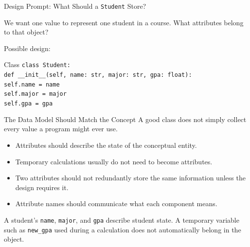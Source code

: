 \documentclass[aspectratio=169,10pt]{beamer}
\begin{document}
\begin{frame}{Design Prompt: What Should a \texttt{Student} Store?}
  \begin{activity}
    We want one value to represent one student in a course. What attributes belong to that object?
  \end{activity}

  Possible design:

  \begin{block}{Class}
    \texttt{class Student:}\\
    \hspace*{0.20in}\texttt{def \_\_init\_\_(self, name: str, major: str, gpa: float):}\\
    \hspace*{0.40in}\texttt{self.name = name}\\
    \hspace*{0.40in}\texttt{self.major = major}\\
    \hspace*{0.40in}\texttt{self.gpa = gpa}
  \end{block}
\end{frame}

\begin{frame}{The Data Model Should Match the Concept}
  A good class does not simply collect every value a program might ever use.

  \begin{itemize}
    \item Attributes should describe the state of the conceptual entity.
    \item Temporary calculations usually do not need to become attributes.
    \item Two attributes should not redundantly store the same information unless the design requires it.
    \item Attribute names should communicate what each component means.
  \end{itemize}

  \begin{exampleblockcp}
    A student's \texttt{name}, \texttt{major}, and \texttt{gpa} describe student state. A temporary variable such as \texttt{new\_gpa} used during a calculation does not automatically belong in the object.
  \end{exampleblockcp}
\end{frame}
\end{document}
